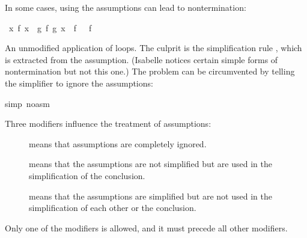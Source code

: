 \begin{isabellebody}
\begin{isamarkuptext}
In some cases, using the assumptions can lead to nontermination:%
\end{isamarkuptext}%
\isamarkuptrue%
\isamarkupfalse%
\ {\isachardoublequoteopen}{\isasymforall}x{\isachardot}\ f\ x\ {\isacharequal}\ g\ {\isacharparenleft}f\ {\isacharparenleft}g\ x{\isacharparenright}{\isacharparenright}\ {\isasymLongrightarrow}\ f\ {\isacharbrackleft}{\isacharbrackright}\ {\isacharequal}\ f\ {\isacharbrackleft}{\isacharbrackright}\ {\isacharat}\ {\isacharbrackleft}{\isacharbrackright}{\isachardoublequoteclose}%
\isadelimproof
%
\endisadelimproof
%
\isatagproof
%
\begin{isamarkuptxt}%
\noindent
An unmodified application of  loops.  The culprit is the
simplification rule , which is extracted from
the assumption.  (Isabelle notices certain simple forms of
nontermination but not this one.)  The problem can be circumvented by
telling the simplifier to ignore the assumptions:%
\end{isamarkuptxt}%
\isamarkuptrue%
\isamarkupfalse%
{\isacharparenleft}simp\ {\isacharparenleft}no{\isacharunderscore}asm{\isacharparenright}{\isacharparenright}\isanewline
{}\isamarkupfalse%
%
\endisatagproof
{\isafoldproof}%
%
\isadelimproof
%
\endisadelimproof
%
\begin{isamarkuptext}%
\noindent
Three modifiers influence the treatment of assumptions:
\begin{description}
\item[]
 means that assumptions are completely ignored.
\item[]
 means that the assumptions are not simplified but
  are used in the simplification of the conclusion.
\item[]
 means that the assumptions are simplified but are not
  used in the simplification of each other or the conclusion.
\end{description}
Only one of the modifiers is allowed, and it must precede all
other modifiers.

\end{isamarkuptext}
\end{isabellebody}
